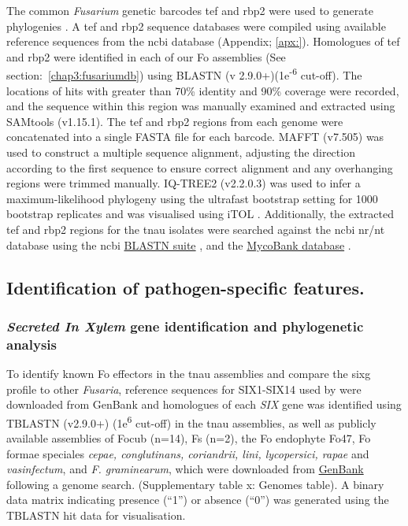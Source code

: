 The common \textit{Fusarium} genetic barcodes \ac{tef} and \ac{rbp2} were used to generate phylogenies \parencite{Edel-Hermann2019}. A \ac{tef} and \ac{rbp2} sequence databases were compiled using available reference sequences from the \ac{ncbi} database (Appendix; \ref{apx:}). Homologues of \ac{tef} and \ac{rbp2} were identified in each of our \ac{Fo} assemblies (See section:~\ref{chap3:fusariumdb}) using BLASTN (v 2.9.0+)(1e\textsuperscript{-6} cut-off). The locations of hits with greater than 70\% identity and 90\% coverage were recorded, and the sequence within this region was manually examined and extracted using SAMtools (v1.15.1). The \ac{tef} and \ac{rbp2} regions from each genome were concatenated into a single FASTA file for each barcode. MAFFT (v7.505) \parencite{Katoh2019} was used to construct a multiple sequence alignment, adjusting the direction according to the first sequence to ensure correct alignment and any overhanging regions were trimmed manually. IQ-TREE2 (v2.2.0.3) \parencite{Nguyen2015} was used to infer a maximum-likelihood phylogeny using the ultrafast bootstrap setting for 1000 bootstrap replicates and was visualised using iTOL \parencite{Letunic2021}. Additionally, the extracted \ac{tef} and \ac{rbp2} regions for the \ac{tnau} isolates were searched against the \ac{ncbi} nr/nt database using the  \ac{ncbi} \href{https://blast.ncbi.nlm.nih.gov/Blast.cgi?PROGRAM=blastn&BLAST_SPEC=GeoBlast&PAGE_TYPE=BlastSearch}{BLASTN suite} \parencite{Nih2014}, and the \href{https://fusarium.mycobank.org/page/Fusarium_table}{MycoBank database} \parencite{Robert2013}. 

\subsection{Identification of pathogen-specific features.}

\subsubsection{\textit{Secreted In Xylem} gene identification and phylogenetic analysis}

To identify known \acs{Fo} effectors in the \ac{tnau} assemblies and compare the \ac{sixg} profile to other \textit{Fusaria}, reference sequences for SIX1-SIX14 used by \textcite{Czislowski2018} were downloaded from  GenBank and homologues of each \textit{SIX} gene was identified using TBLASTN (v2.9.0+) (1e\textsuperscript{6} cut-off) in the \ac{tnau} assemblies, as well as publicly available assemblies of \ac{Focub} (n=14), \ac{Fs} (n=2), the \ac{Fo} endophyte Fo47, \ac{Fo} formae speciales \textit{cepae, conglutinans, coriandrii, lini, lycopersici,  rapae} and \textit{vasinfectum}, and \textit{F. graminearum}, which were downloaded from \href{https://www.ncbi.nlm.nih.gov/data-hub/genome/}{GenBank} following a genome search. (Supplementary table x: Genomes table). A binary data matrix indicating presence (“1”) or absence (“0”) was generated using the TBLASTN hit data for visualisation. 

